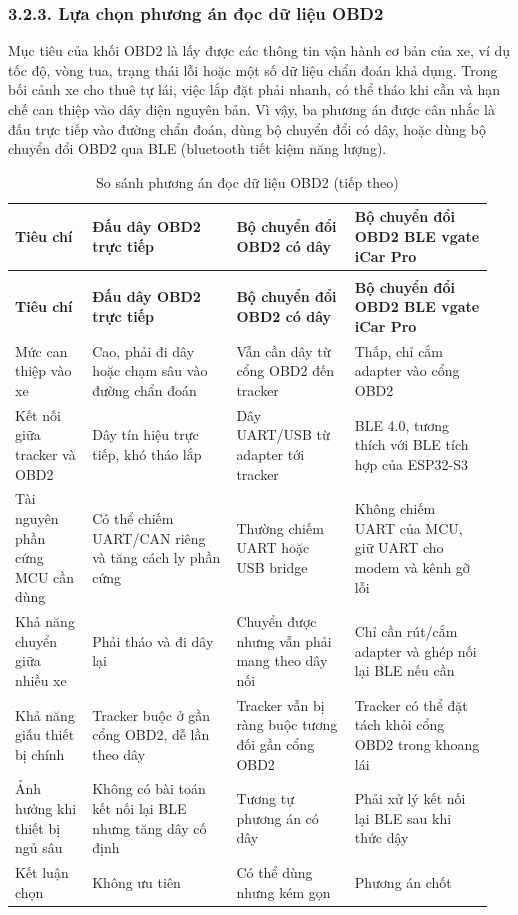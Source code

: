 \documentclass[a4paper]{extarticle}
\newcommand{\thesissettableid}[2]{%
  \renewcommand{\thetable}{#1}%
  \renewcommand{\theHtable}{#2}%
}
\begin{document}
\subsubsection{3.2.3. Lựa chọn phương án đọc dữ liệu OBD2}\label{lux1ef1a-chux1ecdn-phux1b0ux1a1ng-uxe1n-ux111ux1ecdc-dux1eef-liux1ec7u-obd2}

Mục tiêu của khối OBD2 là lấy được các thông tin vận hành cơ bản của xe, ví dụ tốc độ, vòng tua, trạng thái lỗi hoặc một số dữ liệu chẩn đoán khả dụng. Trong bối cảnh xe cho thuê tự lái, việc lắp đặt phải nhanh, có thể tháo khi cần và hạn chế can thiệp vào dây điện nguyên bản. Vì vậy, ba phương án được cân nhắc là đấu trực tiếp vào đường chẩn đoán, dùng bộ chuyển đổi có dây, hoặc dùng bộ chuyển đổi OBD2 qua BLE (bluetooth tiết kiệm năng lượng).

{\thesissettableid{3.7}{condensed-bang-3-7-so-sanh-phuong-an-doc-du-lieu-obd2}
\def\LTcaptype{table}
\begin{longtable}{|L{0.159\linewidth}|L{0.282\linewidth}|L{0.237\linewidth}|L{0.274\linewidth}|}
\caption{So sánh phương án đọc dữ liệu OBD2}\label{tab:condensed-bang-3-7-so-sanh-phuong-an-doc-du-lieu-obd2}\\
\hline
\textbf{Tiêu chí} & \textbf{Đấu dây OBD2 trực tiếp} & \textbf{Bộ chuyển đổi OBD2 có dây} & \textbf{Bộ chuyển đổi OBD2 BLE vgate iCar Pro} \\
\hline
\endfirsthead
\caption[]{So sánh phương án đọc dữ liệu OBD2 (tiếp theo)}\\
\hline
\textbf{Tiêu chí} & \textbf{Đấu dây OBD2 trực tiếp} & \textbf{Bộ chuyển đổi OBD2 có dây} & \textbf{Bộ chuyển đổi OBD2 BLE vgate iCar Pro} \\
\hline
\endhead
\endfoot
\endlastfoot
Mức can thiệp vào xe & Cao, phải đi dây hoặc chạm sâu vào đường chẩn đoán & Vẫn cần dây từ cổng OBD2 đến tracker & Thấp, chỉ cắm adapter vào cổng OBD2 \\\hline
Kết nối giữa tracker và OBD2 & Dây tín hiệu trực tiếp, khó tháo lắp & Dây UART/USB từ adapter tới tracker & BLE 4.0, tương thích với BLE tích hợp của ESP32-S3 \\\hline
Tài nguyên phần cứng MCU cần dùng & Có thể chiếm UART/CAN riêng và tăng cách ly phần cứng & Thường chiếm UART hoặc USB bridge & Không chiếm UART của MCU, giữ UART cho modem và kênh gỡ lỗi \\\hline
Khả năng chuyển giữa nhiều xe & Phải tháo và đi dây lại & Chuyển được nhưng vẫn phải mang theo dây nối & Chỉ cần rút/cắm adapter và ghép nối lại BLE nếu cần \\\hline
Khả năng giấu thiết bị chính & Tracker buộc ở gần cổng OBD2, dễ lần theo dây & Tracker vẫn bị ràng buộc tương đối gần cổng OBD2 & Tracker có thể đặt tách khỏi cổng OBD2 trong khoang lái \\\hline
Ảnh hưởng khi thiết bị ngủ sâu & Không có bài toán kết nối lại BLE nhưng tăng dây cố định & Tương tự phương án có dây & Phải xử lý kết nối lại BLE sau khi thức dậy \\\hline
Kết luận chọn & Không ưu tiên & Có thể dùng nhưng kém gọn & Phương án chốt \\\hline
\end{longtable}
}
\end{document}
